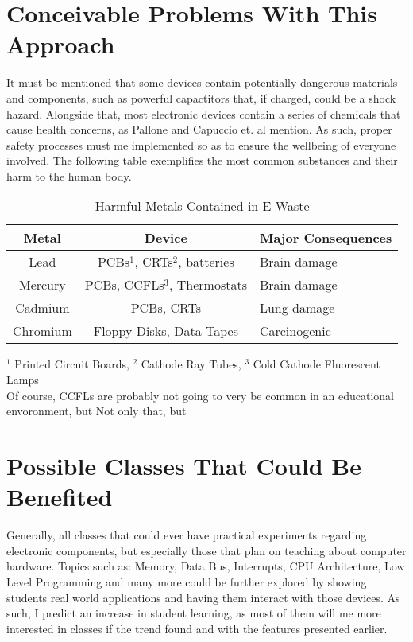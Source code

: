 \documentclass[sigconf, authorversion, nonacm]{acmart}
\begin{document}
\section{Conceivable Problems With This Approach}
It must be mentioned that some devices contain potentially dangerous materials and components, such as powerful capactitors that, if charged, could be a shock hazard. Alongside that, most electronic devices contain a series of chemicals that cause health concerns, as Pallone \cite{SPREE} and Capuccio et. al \cite{Cappuccin} mention. As such, proper safety processes must me implemented so as to ensure the wellbeing of everyone involved. The following table exemplifies the most common substances and their harm to the human body.
\begin{table}[hbt!]
  \caption{Harmful Metals Contained in E-Waste}
  \label{tab:freq}
  \begin{tabular}{ccl}
    \toprule
    Metal&Device&Major Consequences\\
    \midrule
    Lead&PCBs$^1$, CRTs$^2$, batteries&Brain damage\\
    Mercury&PCBs, CCFLs$^3$, Thermostats&Brain damage\\
    Cadmium&PCBs, CRTs&Lung damage\\
    Chromium&Floppy Disks, Data Tapes&Carcinogenic\\
  \bottomrule
\end{tabular}
\end{table}

$^1$ Printed Circuit Boards, $^2$ Cathode Ray Tubes, $^3$ Cold Cathode Fluorescent Lamps\\

Of course, CCFLs are probably not going to very be common in an educational envoronment, but Not only that, but


\section{Possible Classes That Could Be Benefited}
  Generally, all classes that could ever have practical experiments regarding electronic components, but especially those that plan on teaching about computer hardware. Topics such as: Memory, Data Bus, Interrupts, CPU Architecture, Low Level Programming and many more could be further explored by showing students real world applications and having them interact with those devices. As such, I predict an increase in student learning, as most of them will me more interested in classes if the trend \cite{someone} found and with the features presented earlier.
\end{document}

